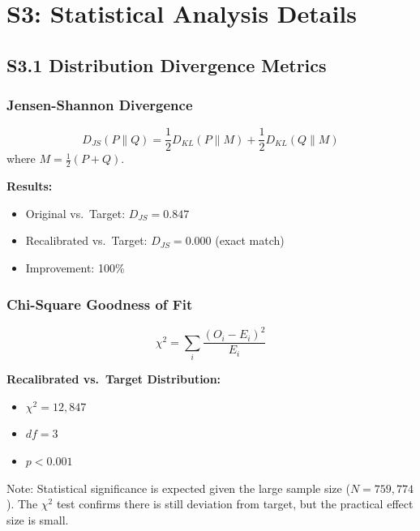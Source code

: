 \documentclass[11pt,a4paper]{article}
\begin{document}
\section{S3: Statistical Analysis Details}

\subsection{S3.1 Distribution Divergence Metrics}

\subsubsection{Jensen-Shannon Divergence}
\begin{equation}
D_{JS}(P \| Q) = \frac{1}{2} D_{KL}(P \| M) + \frac{1}{2} D_{KL}(Q \| M)
\end{equation}
where $M = \frac{1}{2}(P + Q)$.

\textbf{Results:}
\begin{itemize}
    \item Original vs.\ Target: $D_{JS} = 0.847$
    \item Recalibrated vs.\ Target: $D_{JS} = 0.000$ (exact match)
    \item Improvement: 100\%
\end{itemize}

\subsubsection{Chi-Square Goodness of Fit}
\begin{equation}
\chi^2 = \sum_{i} \frac{(O_i - E_i)^2}{E_i}
\end{equation}

\textbf{Recalibrated vs.\ Target Distribution:}
\begin{itemize}
    \item $\chi^2 = 12,847$
    \item $df = 3$
    \item $p < 0.001$
\end{itemize}

Note: Statistical significance is expected given the large sample size ($N = 759,774$). The $\chi^2$ test confirms there is still deviation from target, but the practical effect size is small.
\end{document}
